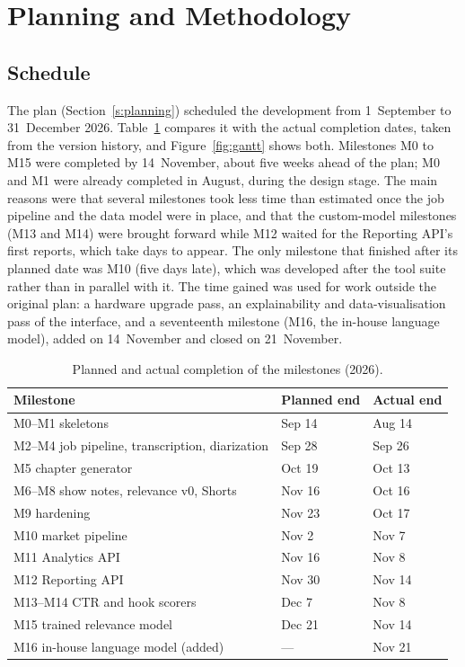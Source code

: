 \section{Planning and Methodology}

\subsection*{Schedule}

The plan (Section~\ref{s:planning}) scheduled the development from 1~September to 31~December 2026. Table~\ref{tab:plan-actual} compares it with the actual completion dates, taken from the version history, and Figure~\ref{fig:gantt} shows both. Milestones M0 to M15 were completed by 14~November, about five weeks ahead of the plan; M0 and M1 were already completed in August, during the design stage. The main reasons were that several milestones took less time than estimated once the job pipeline and the data model were in place, and that the custom-model milestones (M13 and M14) were brought forward while M12 waited for the Reporting API's first reports, which take days to appear. The only milestone that finished after its planned date was M10 (five days late), which was developed after the tool suite rather than in parallel with it. The time gained was used for work outside the original plan: a hardware upgrade pass, an explainability and data-visualisation pass of the interface, and a seventeenth milestone (M16, the in-house language model), added on 14~November and closed on 21~November.

\begin{table}[H]
\centering
\caption{Planned and actual completion of the milestones (2026).}
\label{tab:plan-actual}
\small
\begin{tabular}{@{}lll@{}}
\toprule
\textbf{Milestone} & \textbf{Planned end} & \textbf{Actual end} \\
\midrule
M0--M1 skeletons & Sep 14 & Aug 14 \\
M2--M4 job pipeline, transcription, diarization & Sep 28 & Sep 26 \\
M5 chapter generator & Oct 19 & Oct 13 \\
M6--M8 show notes, relevance v0, Shorts & Nov 16 & Oct 16 \\
M9 hardening & Nov 23 & Oct 17 \\
M10 market pipeline & Nov 2 & Nov 7 \\
M11 Analytics API & Nov 16 & Nov 8 \\
M12 Reporting API & Nov 30 & Nov 14 \\
M13--M14 CTR and hook scorers & Dec 7 & Nov 8 \\
M15 trained relevance model & Dec 21 & Nov 14 \\
M16 in-house language model (added) & --- & Nov 21 \\
\bottomrule
\end{tabular}
\end{table}

